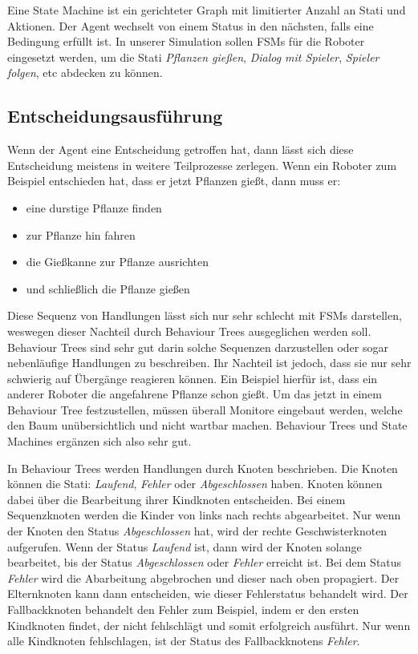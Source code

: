Eine State Machine ist ein gerichteter Graph mit limitierter Anzahl an Stati und Aktionen. Der Agent wechselt von einem Status in den nächsten, falls eine Bedingung erfüllt ist. In unserer Simulation sollen FSMs für die Roboter eingesetzt werden, um die Stati \textit{Pflanzen gießen}, \textit{Dialog mit Spieler}, \textit{Spieler folgen}, etc abdecken zu können. 

\subsection{Entscheidungsausführung}

Wenn der Agent eine Entscheidung getroffen hat, dann lässt sich diese Entscheidung meistens in weitere Teilprozesse zerlegen. Wenn ein Roboter zum Beispiel entschieden hat, dass er jetzt Pflanzen gießt, dann muss er:

\begin{itemize}
\item eine durstige Pflanze finden
\item zur Pflanze hin fahren
\item die Gießkanne zur Pflanze ausrichten
\item und schließlich die Pflanze gießen
\end{itemize}

Diese Sequenz von Handlungen lässt sich nur sehr schlecht mit FSMs darstellen, weswegen dieser Nachteil durch Behaviour Trees ausgeglichen werden soll. Behaviour Trees sind sehr gut darin solche Sequenzen darzustellen oder sogar nebenläufige Handlungen zu beschreiben. Ihr Nachteil ist jedoch, dass sie nur sehr schwierig auf Übergänge reagieren können. Ein Beispiel hierfür ist, dass ein anderer Roboter die angefahrene Pflanze schon gießt. Um das jetzt in einem Behaviour Tree festzustellen, müssen überall Monitore eingebaut werden, welche den Baum unübersichtlich und nicht wartbar machen. Behaviour Trees und State Machines ergänzen sich also sehr gut.

In Behaviour Trees werden Handlungen durch Knoten beschrieben. Die Knoten können die Stati: \textit{Laufend}, \textit{Fehler} oder \textit{Abgeschlossen} haben.
Knoten können dabei über die Bearbeitung ihrer Kindknoten entscheiden. Bei einem Sequenzknoten werden die Kinder von links nach rechts abgearbeitet. Nur wenn der Knoten den Status \textit{Abgeschlossen} hat, wird der rechte Geschwisterknoten aufgerufen. Wenn der Status \textit{Laufend} ist, dann wird der Knoten solange bearbeitet, bis der Status \textit{Abgeschlossen} oder \textit{Fehler} erreicht ist. Bei dem Status \textit{Fehler} wird die Abarbeitung abgebrochen und dieser nach oben propagiert. Der Elternknoten kann dann entscheiden, wie dieser Fehlerstatus behandelt wird.
Der Fallbackknoten behandelt den Fehler zum Beispiel, indem er den ersten Kindknoten findet, der nicht fehlschlägt und somit erfolgreich ausführt. Nur wenn alle Kindknoten fehlschlagen, ist der Status des Fallbackknotens \textit{Fehler}.

